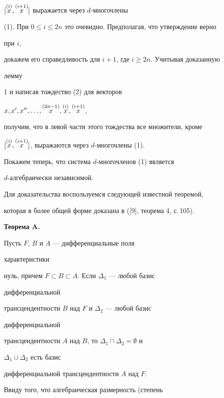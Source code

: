 $[\overset{(i)}{x}{},\overset{(i+1)}{x}{}]$ выражается через $d$-многочлены


(1). При $0\le i\le 2n$ это очевидно. Предполагая, что утверждение верно 


при $i$, 


докажем его справедливость для $i+1$, где $i\ge 2n$. Учитывая доказанную 


лемму


1 и написав тождество (2) для векторов 


$x,x',x'',\dotsc,\overset{(2n-1)}{x}{},\overset{(i)}{x}{},\overset{(i+1)}{x}{}$,


получим, что в левой части этого тождества все множители, кроме


$[\overset{(i)}{x}{},\overset{(i+1)}{x}{}]$, выражаются через $d$-многочлены (1).





Покажем теперь, что система $d$-многочленов (1) является 


$d$-алгебраически независимой.





Для доказательства воспользуемся следующей известной теоремой,


которая в более общей форме доказана в ([9], теорема 4, с.\,105). 


\medskip





{\bf Теорема A.} {\it


Пусть $F$, $B$ и $A$ --- дифференциальные поля 


характеристики 


нуль, причем $F\subset B\subset A$. Если $\Delta_1$ --- любой базис 


дифференциальной 


трансцендентности $B$ над $F$ и $\Delta_2$ --- любой базис 


дифференциальной 


трансцендентности $A$ над $B$, то $\Delta_1\cap\Delta_2=\emptyset$ и 


$\Delta_1\cup\Delta_2$ есть базис 


дифференциальной трансцендентности $A$ над $F$.


}


\medskip





Ввиду того, что алгебраическая размерность (степень 



